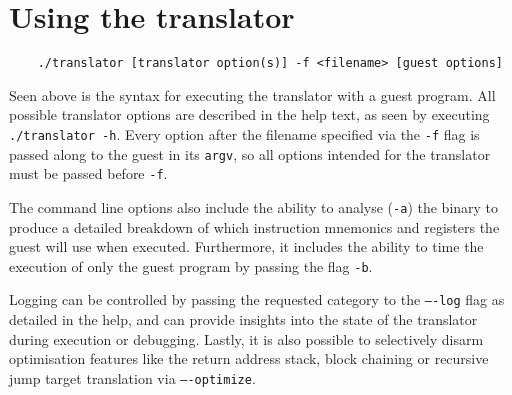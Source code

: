 \section{Using the translator}
\begin{lstlisting}
	./translator [translator option(s)] -f <filename> [guest options]
\end{lstlisting}

Seen above is the syntax for executing the translator with a guest program.
All possible translator options are described in the help text, as seen by executing \texttt{./translator -h}.
Every option after the filename specified via the \texttt{-f} flag is passed along to the guest in its \texttt{argv}, so all options intended for the translator must be passed before \texttt{-f}.

The command line options also include the ability to analyse (\texttt{-a}) the binary to produce a detailed breakdown of which instruction mnemonics and registers the guest will use when executed.
Furthermore, it includes the ability to time the execution of only the guest program by passing the flag \texttt{-b}.

Logging can be controlled by passing the requested category to the \texttt{----log} flag as detailed in the help, and can provide insights into the state of the translator during execution or debugging.
Lastly, it is also possible to selectively disarm optimisation features like the return address stack, block chaining or recursive jump target translation via \texttt{----optimize}.














